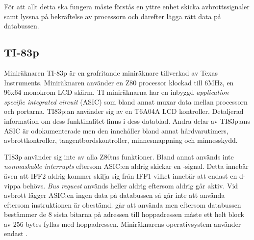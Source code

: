 \documentclass[main.tex]{subfiles}
\begin{document}
För att allt detta ska fungera måste förstås en yttre enhet skicka
avbrottssignaler samt lyssna på bekräftelse av processorn och därefter lägga
rätt data på databussen.

\subsection{TI-83p}
Miniräknaren TI-83p är en grafritande miniräknare tillverkad av Texas
Instruments. Miniräknaren använder en Z80 processor klockad till 6MHz, en 96x64
monokrom LCD-skärm. TI-miniräknarna har en inbyggd {\it application specific
integrated circuit} (ASIC) som bland annat muxar data mellan processorn och
portarna. TI83p:an använder sig av en T6A04A LCD kontroller. Detaljerad
information om dess funktinalitet finns i dess datablad. Andra delar av
TI83p:ans ASIC är odokumenterade men den innehåller bland annat hårdvarutimers,
avbrottkontroller, tangentbordskontroller, minnesmappning och minnesskydd.

TI83p använder sig inte av alla Z80:ns funktioner. Bland annat används inte
{\it nonmaskable interrupts} eftersom ASIC:en aldrig skickar en
-signal. Detta innebär även att IFF2 aldrig kommer skilja sig från
IFF1 vilket innebär att endast en d-vippa behövs. {\it Bus request} används
heller aldrig eftersom  aldrig går aktiv. Vid avbrott lägger
ASIC:en ingen data på databussen så  går inte att använda eftersom
instruktionen är obestämd.  går att använda men eftersom databussen
bestämmer de 8 sista bitarna på adressen till hoppadressen måste ett helt block
av 256 bytes fyllas med hoppadressen. Miniräknarens operativsystem använder
endast .

\clearpage
\end{document}

